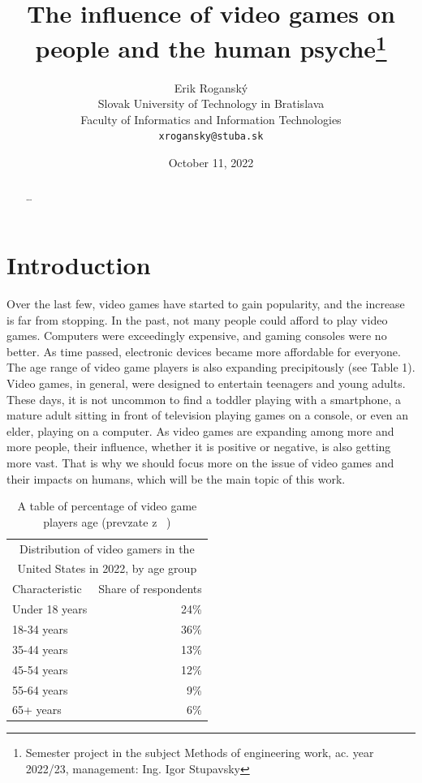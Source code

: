 \documentclass[10pt,twoside,english,a4paper]{article}
\title{The influence of video games on people and the human psyche\thanks{Semester project in the subject Methods of engineering work, ac. year 2022/23, management: Ing. Igor Stupavsky}}
\author{Erik Roganský\\[2pt]
	{\small Slovak University of Technology in Bratislava}\\
	{\small Faculty of Informatics and Information Technologies}\\
	{\small \texttt{xrogansky@stuba.sk}}
	}
\date{\small October 11, 2022}
\begin{document}
\maketitle

\begin{abstract}
\ldots
\end{abstract}



\section{Introduction}
Over the last few, video games have started to gain popularity, and the increase is far from stopping. In the past, not many people could afford to play video games. Computers were exceedingly expensive, and gaming consoles were no better. As time passed, electronic devices became more affordable for everyone. The age range of video game players is also expanding precipitously (see Table 1). Video games, in general, were designed to entertain teenagers and young adults. These days, it is not uncommon to find a toddler playing with a smartphone, a mature adult sitting in front of television playing games on a console, or even an elder, playing on a computer. As video games are expanding among more and more people, their influence, whether it is positive or negative, is also getting more vast. That is why we should focus more on the issue of video games and their impacts on humans, which will be the main topic of this work.

\begin{table}[h]
\centering
\begin{tabular}{ |p{3cm} r| }
 \hline
 \multicolumn{2}{|c|}{Distribution of video gamers in the} \\
 \multicolumn{2}{|c|}{United States in 2022, by age group} \\
 \hline
 Characteristic & Share of respondents\\
 \hline
 Under 18 years & 24\%\\
 18-34 years & 36\%\\
 35-44 years & 13\%\\
 45-54 years & 12\%\\
 55-64 years & 9\%\\
 65+ years & 6\%\\
 \hline
\end{tabular}
\caption{A table of percentage of video game players age (prevzate z ~\cite{age2022})}
\end{table}
\end{document}
